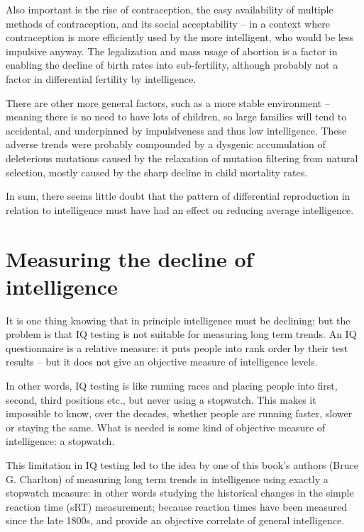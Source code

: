 \documentclass[
]{book}
\begin{document}
Also important is the rise of contraception, the easy availability of multiple methods of contraception, and its social acceptability -- in a context where contraception is more efficiently used by the more intelligent, who would be less impulsive anyway. The legalization and mass usage of abortion is a factor in enabling the decline of birth rates into sub-fertility, although probably not a factor in differential fertility by intelligence.

There are other more general factors, such as a more stable environment -- meaning there is no need to have lots of children, so large families will tend to accidental, and underpinned by impulsiveness and thus low intelligence. These adverse trends were probably compounded by a dysgenic accumulation of deleterious mutations caused by the relaxation of mutation filtering from natural selection, mostly caused by the sharp decline in child mortality rates.

In sum, there seems little doubt that the pattern of differential reproduction in relation to intelligence must have had an effect on reducing average intelligence.

\hypertarget{measuring-the-decline-of-intelligence}{%
\section{Measuring the decline of intelligence}\label{measuring-the-decline-of-intelligence}}

It is one thing knowing that in principle intelligence must be declining; but the problem is that IQ testing is not suitable for measuring long term trends. An IQ questionnaire is a relative measure: it puts people into rank order by their test results -- but it does not give an objective measure of intelligence levels.

In other words, IQ testing is like running races and placing people into first, second, third positions etc., but never using a stopwatch. This makes it impossible to know, over the decades, whether people are running faster, slower or staying the same. What is needed is some kind of objective measure of intelligence: a stopwatch.

This limitation in IQ testing led to the idea by one of this book's authors (Bruce G. Charlton) of measuring long term trends in intelligence using exactly a stopwatch measure: in other words studying the historical changes in the simple reaction time (sRT) measurement; because reaction times have been measured since the late 1800s, and provide an objective correlate of general intelligence.
\end{document}
